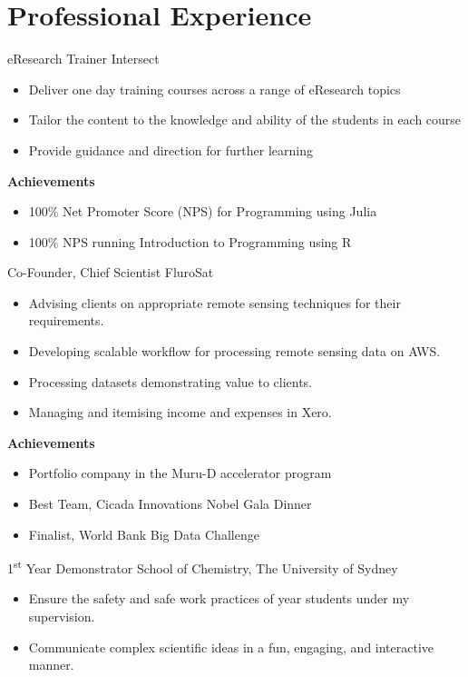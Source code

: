 \section{Professional Experience}

{eResearch Trainer}
{Intersect}{}{}
{%
  \begin{itemize}
    \item Deliver one day training courses across a range of eResearch topics
    \item Tailor the content to the knowledge and ability of the students in each course
    \item Provide guidance and direction for further learning
  \end{itemize}
  \textbf{Achievements}
  \begin{itemize}
    \item 100\% Net Promoter Score (NPS) for Programming using Julia
    \item 100\% NPS running Introduction to Programming using R
  \end{itemize}
}
\vspace{1em}

{Co-Founder, Chief Scientist}
{FluroSat}{}{}
{%
  \begin{itemize}
    \item Advising clients on appropriate remote sensing techniques for their
      requirements.
    \item Developing scalable workflow for processing remote sensing data on AWS.
    \item Processing datasets demonstrating value to clients.
    \item Managing and itemising income and expenses in Xero.
  \end{itemize}
  \textbf{Achievements}
  \begin{itemize}
    \item Portfolio company in the Muru-D accelerator program
    \item Best Team, Cicada Innovations Nobel Gala Dinner
    \item Finalist, World Bank Big Data Challenge
  \end{itemize}
}
\vspace{1em}

{1\textsuperscript{st} Year Demonstrator}
{School of Chemistry, The University of Sydney}
{}{}
{%
    \begin{itemize}
      \item Ensure the safety and safe work practices
        of  year students under my supervision.
      \item Communicate complex scientific ideas
        in a fun, engaging, and interactive manner.
    \end{itemize}
}
\vspace{1em}

